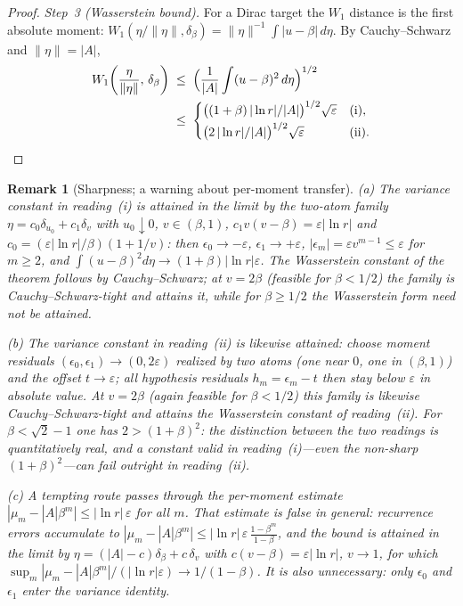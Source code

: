 \documentclass[pdflatex,sn-mathphys-num]{sn-jnl}
\theoremstyle{thmstyleone}
\theoremstyle{thmstyletwo}
\newtheorem*{remark}{Remark}
\theoremstyle{thmstylethree}
\begin{document}
\begin{proof}
\textit{Step~3 (Wasserstein bound).}  For a Dirac target the
$W_1$ distance is the first absolute moment:
$W_1(\eta/\|\eta\|, \delta_\beta) = \|\eta\|^{-1}\int|u-\beta|
\,d\eta$.  By Cauchy--Schwarz and $\|\eta\| = |A|$,
\[
\begin{aligned}
  W_1\!\left(\frac{\eta}{\|\eta\|},\,\delta_\beta\right)
  &\;\le\; \Bigl(\frac{1}{|A|}\int (u-\beta)^2\,d\eta\Bigr)^{1/2}\\
  &\;\le\;
  \begin{cases}
    \bigl((1+\beta)\,|\ln r|/|A|\bigr)^{1/2}\sqrt{\varepsilon}
      & \text{(i)},\\[2pt]
    \bigl(2\,|\ln r|/|A|\bigr)^{1/2}\sqrt{\varepsilon}
      & \text{(ii)}.
  \end{cases}
\end{aligned} \qedhere
\]
\end{proof}

\begin{remark}[Sharpness; a warning about per-moment transfer]
\textup{(a)} The variance constant in reading~(i) is attained in the
limit by
the two-atom family $\eta = c_0\delta_{u_0} + c_1\delta_v$ with
$u_0 \downarrow 0$, $v \in (\beta,1)$, $c_1 v(v-\beta) =
\varepsilon|\ln r|$ and $c_0 = (\varepsilon|\ln r|/\beta)(1 + 1/v)$:
then $\epsilon_0 \to -\varepsilon$, $\epsilon_1 \to +\varepsilon$,
$|\epsilon_m| = \varepsilon v^{m-1} \le \varepsilon$ for $m \ge 2$,
and $\int(u-\beta)^2 d\eta \to (1+\beta)|\ln r|\varepsilon$.  The
Wasserstein constant of the theorem follows by Cauchy--Schwarz; at
$v = 2\beta$ (feasible for $\beta < 1/2$) the family is
Cauchy--Schwarz-tight and attains it, while for $\beta \ge 1/2$ the
Wasserstein form need not be attained.

\textup{(b)} The variance constant in reading~(ii) is likewise
attained:
choose moment residuals $(\epsilon_0, \epsilon_1) \to (0,
2\varepsilon)$ realized by two atoms (one near $0$, one in
$(\beta,1)$) and the offset $t \to \varepsilon$; all hypothesis
residuals $h_m = \epsilon_m - t$ then stay below $\varepsilon$ in
absolute value.  At $v = 2\beta$ (again feasible for $\beta < 1/2$)
this family is likewise Cauchy--Schwarz-tight and attains the
Wasserstein constant of reading~(ii).  For $\beta < \sqrt2 - 1$ one has $2 >
(1+\beta)^2$: the distinction between the two readings is
quantitatively real, and a constant valid in reading~(i)---even the
non-sharp $(1+\beta)^2$---can \emph{fail} outright in reading~(ii).

\textup{(c)} A tempting route passes through the per-moment estimate
$|\mu_m - |A|\beta^m| \le |\ln r|\,\varepsilon$ for all $m$.  That
estimate is false in general: recurrence errors accumulate to
$|\mu_m - |A|\beta^m| \le |\ln r|\,\varepsilon\,
\tfrac{1-\beta^m}{1-\beta}$, and the bound is attained in the limit
by $\eta = (|A|-c)\delta_\beta + c\,\delta_v$ with $c(v-\beta) =
\varepsilon|\ln r|$, $v \to 1$, for which
$\sup_m |\mu_m - |A|\beta^m| / (|\ln r|\varepsilon) \to
1/(1-\beta)$.  It is also unnecessary: only $\epsilon_0$ and
$\epsilon_1$ enter the variance identity.
\end{remark}
\end{document}
